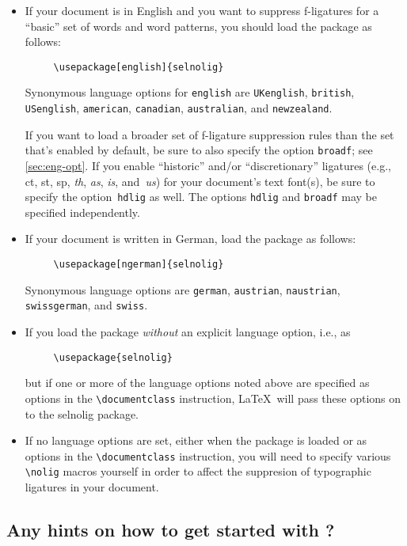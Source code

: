 \documentclass[11pt]{article}
\newcommand{\pkg}[1]{\textsf{#1}}
\newcommand{\opt}[1]{\texttt{#1}}
\newcommand{\cmmd}[1]{\texttt{\textbackslash #1}}
\begin{document}
\begin{itemize}
\item If your document is in English and you want to suppress f-ligatures for a \enquote{basic} set of words and word patterns, you should load the package as follows:
\begin{Verbatim}
     \usepackage[english]{selnolig}
\end{Verbatim}
Synonymous language options for \opt{english} are \opt{UKenglish}, \opt{british}, \opt{USenglish}, \opt{american}, \opt{cana\-dian}, \opt{australian}, and \opt{new\-zealand}.


If you want to load a broader set of f-ligature suppression rules than the set that's enabled by default, be sure to also specify the option \opt{broadf}; see \cref{sec:eng-opt}.
If you enable \enquote{historic} and/or \enquote{discretionary} ligatures (e.g., ct, st, sp, \emph{th}, \emph{as}, \emph{is}, and~\emph{us}) for your document's text font(s), be sure to specify the option~\opt{hdlig} as well. The options \opt{hdlig} and \opt{broadf} may be specified independently.

\item If your document is written in German, load the package as follows:
\begin{Verbatim}
     \usepackage[ngerman]{selnolig}
\end{Verbatim}
Synonymous language options are \opt{german}, \opt{austrian}, \opt{naustrian}, \opt{swissgerman}, and \opt{swiss}.

\item If you load the package \emph{without} an explicit language option, i.e., as
\begin{Verbatim}
     \usepackage{selnolig}
\end{Verbatim}
but if one or more of the language options noted above are specified as options in the \cmmd{documentclass} instruction, \LaTeX\ will pass these options on to the \pkg{selnolig} package.

\item If no language options are set, either when the package is loaded or as options in the \cmmd{documentclass} instruction, you will need to specify various \cmmd{nolig} macros yourself in order to affect the suppresion of typographic ligatures in your document.
\end{itemize}


\subsection{Any hints on how to get started with \LuaLaTeX?}
\end{document}
